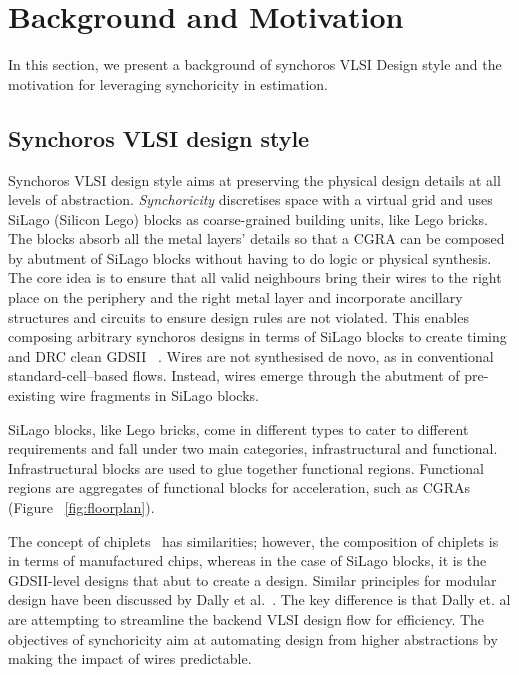 \section{Background and Motivation}
In this section, we present a background of synchoros VLSI Design style and the motivation for leveraging synchoricity in estimation. 
\subsection{Synchoros VLSI design style}
Synchoros VLSI design style aims at preserving the physical design details at all levels of abstraction.
\textit{Synchoricity} discretises space with a virtual grid and uses SiLago (Silicon Lego) blocks as coarse-grained building units, like Lego bricks.
The blocks absorb all the metal layers' details so that a CGRA can be composed by abutment of SiLago blocks without having to do logic or physical synthesis. 
The core idea is to ensure that all valid neighbours bring their wires to the right place on the periphery and the right metal layer and incorporate ancillary structures and circuits to ensure design rules are not violated. 
This enables composing arbitrary synchoros designs in terms of SiLago blocks to create timing and DRC clean GDSII ~\cite{gonzalez2021synthesis,stathis2023clock}. 
Wires are not synthesised de novo, as in conventional standard-cell–based flows.
Instead, wires emerge through the abutment of pre-existing wire fragments in SiLago blocks. 

SiLago blocks, like Lego bricks, come in different types to cater to different requirements and fall under two main categories, infrastructural and functional.
Infrastructural blocks are used to glue together functional regions.
Functional regions are aggregates of functional blocks for acceleration, such as CGRAs (Figure ~\ref{fig:floorplan}). 

The concept of chiplets~\cite{loh2021understanding} has similarities; however, the composition of chiplets is in terms of manufactured chips, whereas in the case of SiLago blocks, it is the GDSII-level designs that abut to create a design. Similar principles for modular design have been discussed by Dally et al.~\cite{dally201321st}. 
The key difference is that Dally et. al are attempting to streamline the backend VLSI design flow for efficiency.
The objectives of synchoricity aim at automating design from higher abstractions by making the impact of wires predictable. 


